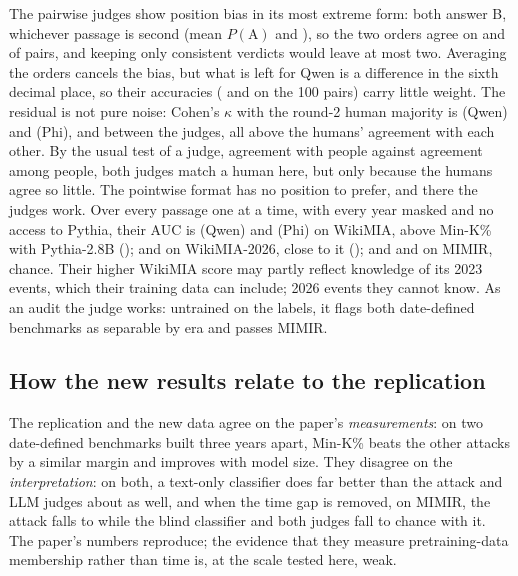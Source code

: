 \documentclass[11pt]{article}
\begin{document}
The pairwise judges show position bias in its most extreme form: both answer B, whichever passage is second (mean $P(\mathrm{A})$ \JudgeQwenPA{} and \JudgePhiPA{}), so the two orders agree on \JudgeQwenConsistent{} and \JudgePhiConsistent{} of pairs, and keeping only consistent verdicts would leave at most two. Averaging the orders cancels the bias, but what is left for Qwen is a difference in the sixth decimal place, so their accuracies (\JudgeQwenPairAccOne{} and \JudgePhiPairAccOne{} on the 100 pairs) carry little weight. The residual is not pure noise: Cohen's $\kappa$ with the round-2 human majority is \KappaQwenMajorityTwo{} (Qwen) and \KappaPhiMajorityTwo{} (Phi), and \KappaJudgesTwo{} between the judges, all above the humans' agreement with each other. By the usual test of a judge, agreement with people against agreement among people, both judges match a human here, but only because the humans agree so little. The pointwise format has no position to prefer, and there the judges work. Over every passage one at a time, with every year masked and no access to Pythia, their AUC is \JudgeQwenWiki{} (Qwen) and \JudgePhiWiki{} (Phi) on WikiMIA, above Min-K\% with Pythia-2.8B (\RepMinK{}); \JudgeQwenNew{} and \JudgePhiNew{} on WikiMIA-2026, close to it (\NewMinK{}); and \JudgeQwenMimir{} and \JudgePhiMimir{} on MIMIR, chance. Their higher WikiMIA score may partly reflect knowledge of its 2023 events, which their training data can include; 2026 events they cannot know. As an audit the judge works: untrained on the labels, it flags both date-defined benchmarks as separable by era and passes MIMIR.

\begin{table}[t]
\centering\footnotesize

\caption{Recency judgements on the annotated WikiMIA-2026 pairs (64 words, years masked); a correct answer identifies the 2026 passage, and accuracy over member/non-member pairs estimates AUC. Round 2's 40 pairs are a subset of round 1's 100. A1 is the author. Accuracy excludes ``can't tell''; Wilson 95\% intervals. Machine rows score the same pairs.}
\label{tab:annotation}
\end{table}

\subsection{How the new results relate to the replication}

The replication and the new data agree on the paper's \emph{measurements}: on two date-defined benchmarks built three years apart, Min-K\% beats the other attacks by a similar margin and improves with model size. They disagree on the \emph{interpretation}: on both, a text-only classifier does far better than the attack and LLM judges about as well, and when the time gap is removed, on MIMIR, the attack falls to \MimirMinK{} while the blind classifier and both judges fall to chance with it. The paper's numbers reproduce; the evidence that they measure pretraining-data membership rather than time is, at the scale tested here, weak.
\end{document}
